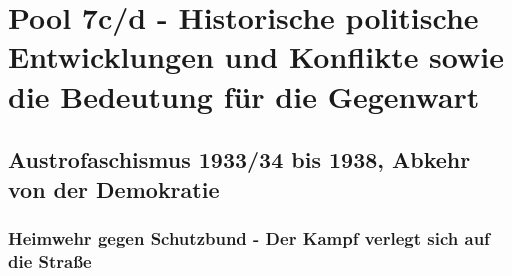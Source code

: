 \documentclass[letterpaper, 12pt]{article}
\let\tempsection\section
\renewcommand\section[1]{\vspace{-0.3cm}\tempsection{#1}\vspace{-0.3cm}}
\let\tempsubsection\subsection
\renewcommand\subsection[1]{\vspace{0cm}\tempsubsection{#1}\vspace{0cm}}
\let\tempsubsubsection\subsubsection
\renewcommand\subsubsection[1]{\vspace{0cm}\tempsubsubsection{#1}\vspace{0cm}}
\begin{document}
\parindent 0pt
\parskip 6pt



\clearpage
\thispagestyle{empty}
\tableofcontents

\newpage
{}
\pagestyle{fancy}


\section{Pool 7c/d - Historische politische Entwicklungen und Konflikte sowie die Bedeutung für die Gegenwart \cite{buch}}

\subsection{Austrofaschismus 1933/34 bis 1938, Abkehr von der Demokratie}

\subsubsection{Heimwehr gegen Schutzbund - Der Kampf verlegt sich auf die Straße}
\end{document}
